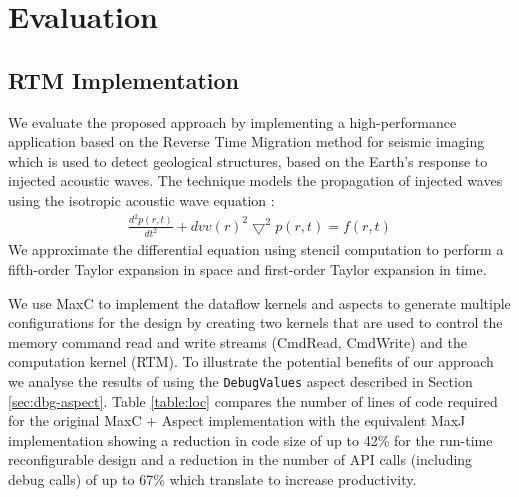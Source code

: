 \section{Evaluation}

\subsection{RTM Implementation}
We evaluate the proposed approach by implementing a high-performance
application based on the Reverse Time Migration method for seismic
imaging which is used to detect geological structures, based on the
Earth's response to injected acoustic waves. The technique models the
propagation of injected waves using the isotropic acoustic wave
equation \cite{araya2011assessing}:
\begin{align}
\frac{d^2p(r,t)}{dt^2} + {dvv(r)}^2\bigtriangledown^2p(r,t) = f(r,t)
\end{align}
We approximate the differential equation using stencil computation to
perform a fifth-order Taylor expansion in space and first-order Taylor
expansion in time.

We use MaxC to implement the dataflow kernels and aspects to generate
multiple configurations for the design by creating two kernels that
are used to control the memory command read and write streams
(CmdRead, CmdWrite) and the computation kernel (RTM).  To illustrate
the potential benefits of our approach we analyse the results of using
the \texttt{DebugValues} aspect described in Section
\ref{sec:dbg-aspect}.  Table \ref{table:loc} compares the number of
lines of code required for the original MaxC + Aspect implementation
with the equivalent MaxJ implementation showing a reduction in code
size of up to 42\% for the run-time reconfigurable design and a
reduction in the number of API calls (including debug calls) of up to
67\% which translate to increase productivity.


